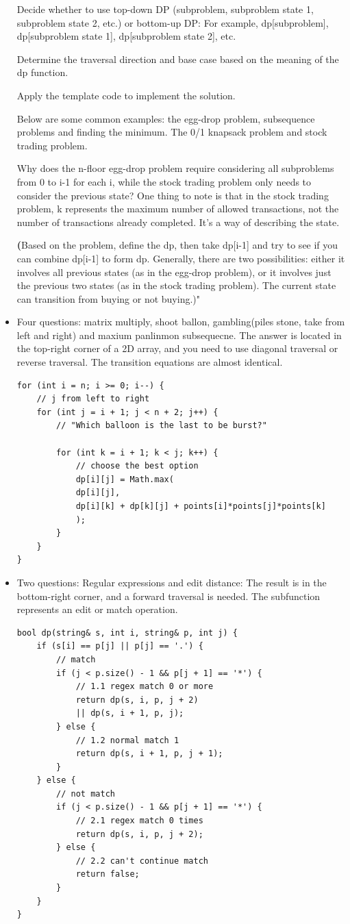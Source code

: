 \documentclass[a4paper,11pt,twoside]{book}
\begin{document}
\begin{itemize}
	Decide whether to use top-down DP (subproblem, subproblem state 1, subproblem state 2, etc.) or bottom-up DP: For example, dp[subproblem], dp[subproblem state 1], dp[subproblem state 2], etc.
	
	Determine the traversal direction and base case based on the meaning of the dp function.
	
	Apply the template code to implement the solution.
	
	
	Below are some common examples: the egg-drop problem, subsequence problems and finding the minimum. The 0/1 knapsack problem and stock trading problem.
	
	Why does the n-floor egg-drop problem require considering all subproblems from 0 to i-1 for each i, while the stock trading problem only needs to consider the previous state?  One thing to note is that in the stock trading problem, k represents the maximum number of allowed transactions, not the number of transactions already completed. It’s a way of describing the state.
	
	\textbf(Based on the problem, define the dp, then take dp[i-1] and try to see if you can combine dp[i-1] to form dp. Generally, there are two possibilities: either it involves all previous states (as in the egg-drop problem), or it involves just the previous two states (as in the stock trading problem). The current state can transition from buying or not buying.)"
	
	
	\item Four questions: matrix multiply, shoot ballon, gambling(piles stone, take from left and right) and maxium panlinmon subsequecne. The answer is located in the top-right corner of a 2D array, and you need to use diagonal traversal or reverse traversal. The transition equations are almost identical.
	
\begin{lstlisting}
for (int i = n; i >= 0; i--) {
	// j from left to right
	for (int j = i + 1; j < n + 2; j++) {
		// "Which balloon is the last to be burst?"
		
		for (int k = i + 1; k < j; k++) {
			// choose the best option
			dp[i][j] = Math.max(
			dp[i][j], 
			dp[i][k] + dp[k][j] + points[i]*points[j]*points[k]
			);
		}
	}
}	
\end{lstlisting}	
	
	\item Two questions: Regular expressions and edit distance: The result is in the bottom-right corner, and a forward traversal is needed. The subfunction represents an edit or match operation.
\begin{lstlisting}
bool dp(string& s, int i, string& p, int j) {
	if (s[i] == p[j] || p[j] == '.') {
		// match
		if (j < p.size() - 1 && p[j + 1] == '*') {
			// 1.1 regex match 0 or more
			return dp(s, i, p, j + 2)
			|| dp(s, i + 1, p, j);
		} else {
			// 1.2 normal match 1 
			return dp(s, i + 1, p, j + 1);
		}
	} else {
		// not match 
		if (j < p.size() - 1 && p[j + 1] == '*') {
			// 2.1 regex match 0 times
			return dp(s, i, p, j + 2);
		} else {
			// 2.2 can't continue match
			return false;
		}
	}
}


\end{lstlisting}
\end{itemize}
\end{document}
